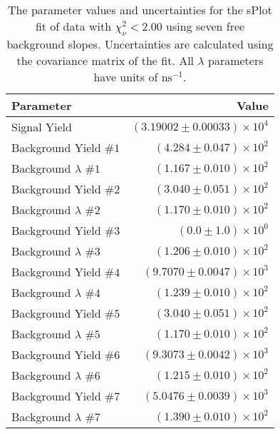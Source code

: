 
\begin{table}[ht]
    \begin{center}
        \begin{tabular}{lr}\toprule
            Parameter & Value \\\midrule
            Signal Yield & $(3.19002 \pm 0.00033) \times 10^{4}$ \\
            Background Yield $\#1$ & $(4.284 \pm 0.047) \times 10^{2}$ \\
            Background $\lambda$ $\#1$ & $(1.167 \pm 0.010) \times 10^{2}$ \\
            Background Yield $\#2$ & $(3.040 \pm 0.051) \times 10^{2}$ \\
            Background $\lambda$ $\#2$ & $(1.170 \pm 0.010) \times 10^{2}$ \\
            Background Yield $\#3$ & $(0.0 \pm 1.0) \times 10^{0}$ \\
            Background $\lambda$ $\#3$ & $(1.206 \pm 0.010) \times 10^{2}$ \\
            Background Yield $\#4$ & $(9.7070 \pm 0.0047) \times 10^{3}$ \\
            Background $\lambda$ $\#4$ & $(1.239 \pm 0.010) \times 10^{2}$ \\
            Background Yield $\#5$ & $(3.040 \pm 0.051) \times 10^{2}$ \\
            Background $\lambda$ $\#5$ & $(1.170 \pm 0.010) \times 10^{2}$ \\
            Background Yield $\#6$ & $(9.3073 \pm 0.0042) \times 10^{3}$ \\
            Background $\lambda$ $\#6$ & $(1.215 \pm 0.010) \times 10^{2}$ \\
            Background Yield $\#7$ & $(5.0476 \pm 0.0039) \times 10^{3}$ \\
            Background $\lambda$ $\#7$ & $(1.390 \pm 0.010) \times 10^{2}$ \\\bottomrule
        \end{tabular}
        \caption{The parameter values and uncertainties for the sPlot fit of data with $\chi^2_\nu < 2.00$ using seven free background slopes. Uncertainties are calculated using the covariance matrix of the fit. All $\lambda$ parameters have units of $\si{\nano\second}^{-1}$.}\label{tab:splot-fit-results-chisqdof-2.00-free-7}
    \end{center}
\end{table}
